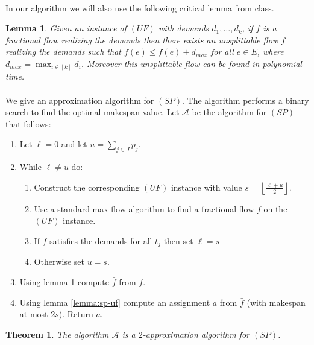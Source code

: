 \documentclass[letterpaper,12pt,oneside,onecolumn]{article}
\newcommand{\cA}{\mathcal{A}} \newcommand{\cB}{\mathcal{B}}
\newtheorem{lemma}[fact]{Lemma}
\newtheorem{theorem}[fact]{Theorem}
\newcommand{\floor}[1]{\ensuremath{\left\lfloor#1\right\rfloor}}
\begin{document}
\paragraph{}
In our algorithm we will also use the following critical lemma from class.
\begin{lemma}\label{lemma:ff-uf}
Given an instance of $(UF)$ with demands $d_1, \dots, d_k$, if $f$ is a fractional flow realizing the demands then there exists an unsplittable flow $\bar{f}$ realizing the demands such that $\bar{f}(e) \leq f(e) + d_{max}$ for all $e \in E$, where $d_{max} = \max_{i\in [k]} d_i$. Moreover this unsplittable flow can be found in polynomial time.
\end{lemma}
\paragraph{}
We give an approximation algorithm for $(SP)$. The algorithm performs a binary search to find the optimal makespan value. Let $\cA$ be the algorithm for $(SP)$ that follows:
\begin{enumerate}
\item Let $\ell = 0$ and let $u = \sum_{j \in J} p_j$.
\item While $\ell \neq u$ do:
	\begin{enumerate}
	\item Construct the corresponding $(UF)$ instance with value $s=\floor{\frac{\ell + u}{2}}$.
	\item Use a standard max flow algorithm to find a fractional flow $f$ on the $(UF)$ instance.
	\item If $f$ satisfies the demands for all $t_j$ then set $\ell = s$
	\item Otherwise set $u = s$.
	\end{enumerate}
\item Using lemma \ref{lemma:ff-uf} compute $\bar{f}$ from $f$.
\item Using lemma \ref{lemma:sp-uf} compute an assignment $a$ from $\bar{f}$ (with makespan at most $2s$). Return $a$.
\end{enumerate}
\begin{theorem}
The algorithm $\cA$ is a $2$-approximation algorithm for $(SP)$.
\end{theorem}
\end{document}
